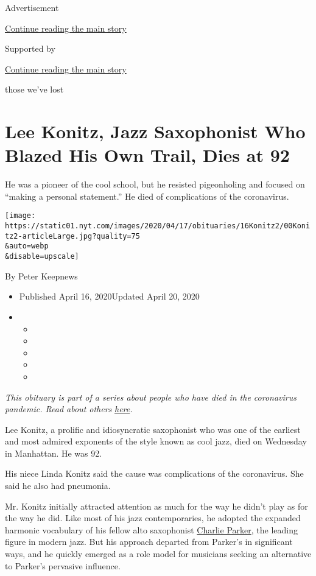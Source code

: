 Advertisement

\protect\hyperlink{after-top}{Continue reading the main story}

Supported by

\protect\hyperlink{after-sponsor}{Continue reading the main story}

those we've lost

\hypertarget{lee-konitz-jazz-saxophonist-who-blazed-his-own-trail-dies-at-92}{%
\section{Lee Konitz, Jazz Saxophonist Who Blazed His Own Trail, Dies at
92}\label{lee-konitz-jazz-saxophonist-who-blazed-his-own-trail-dies-at-92}}

He was a pioneer of the cool school, but he resisted pigeonholing and
focused on ``making a personal statement.'' He died of complications of
the coronavirus.

\texttt{[image: https://static01.nyt.com/images/2020/04/17/obituaries/16Konitz2/00Konitz2-articleLarge.jpg?quality=75\\\&auto=webp\\\&disable=upscale]}

By Peter Keepnews

\begin{itemize}
\item
  Published April 16, 2020Updated April 20, 2020
\item
  \begin{itemize}
  \item
  \item
  \item
  \item
  \item
  \end{itemize}
\end{itemize}

\emph{This obituary is part of a series about people who have died in
the coronavirus pandemic. Read about others}
\href{https://www.nytimes.com/series/people-who-have-died-of-the-coronavirus}{\emph{here}}\emph{.}

Lee Konitz, a prolific and idiosyncratic saxophonist who was one of the
earliest and most admired exponents of the style known as cool jazz,
died on Wednesday in Manhattan. He was 92.

His niece Linda Konitz said the cause was complications of the
coronavirus. She said he also had pneumonia.

Mr. Konitz initially attracted attention as much for the way he didn't
play as for the way he did. Like most of his jazz contemporaries, he
adopted the expanded harmonic vocabulary of his fellow alto saxophonist
\href{https://www.nytimes.com/1955/03/15/archives/charlie-parker-jazz-master-dies-a-bebop-founder-and-top-saxophonist.html}{Charlie
Parker}, the leading figure in modern jazz. But his approach departed
from Parker's in significant ways, and he quickly emerged as a role
model for musicians seeking an alternative to Parker's pervasive
influence.

